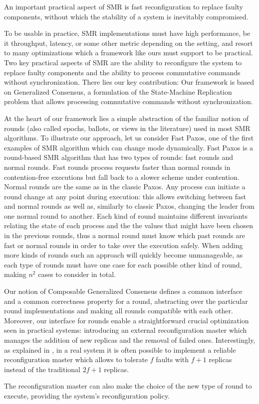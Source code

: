 An important practical aspect of SMR is fast reconfiguration to replace faulty components, without which the stability of a system is inevitably compromised.

To be usable in  practice, SMR implementations must have high performance, be it throughput, latency, or some other metric depending on the setting, and resort to many optimizations which a framework like ours must support to be practical.
Two key practical aspects of SMR are the ability to reconfigure the system to replace faulty components and the ability to process commutative commands without synchronization.
There lies our key contribution: 
Our framework is based on Generalized Consensus, a formulation of the State-Machine Replication problem that allows processing commutative commands without synchronization.

At the heart of our framework lies a simple abstraction of the familiar notion of rounds (also called epochs, ballots, or views in the literature) used in most SMR algorithms. To illustrate our approach, let us consider Fast Paxos, one of the first examples of SMR algorithm which can change mode dynamically.
Fast Paxos is a round-based SMR algorithm that has two types of rounds: fast rounds and normal rounds. Fast rounds process requests faster than normal rounds in contention-free executions but fall back to a slower scheme under contention. Normal rounds are the same as in the classic Paxos. Any process can initiate a round change at any point during execution: this allows switching between fast and normal rounds as well as, similarly to classic Paxos, changing the leader from one normal round to
another. Each kind of round maintains different invariants relating the state of each process and the the values that might have been chosen in the previous rounds, thus a normal round must know which past rounds are fast or normal rounds in order to take over the execution safely. When adding more kinds of rounds such an approach will quickly become unmanageable, as each type of rounds must have one case for each possible other kind of round, making $n^2$ cases to consider in total.

Our notion of Composable Generalized Consensus defines a common interface and a common correctness property for a round, abstracting over the particular round implementations and making all rounds compatible with each other. 
Moreover, our interface for rounds enable a straightforward crucial optimization seen in practical systems: introducing an external reconfiguration master which manages the addition of new replicas and the removal of failed ones. Interestingly, as explained in \cite{LamportMalkhiZhou09VerticalPaxosPrimarybackupReplication}, in a real system it is often possible to implement a reliable reconfiguration master which allows to tolerate $f$ faults with $f+1$ replicas instead of the traditional $2f+1$ replicas.

The reconfiguration master can also make the choice of the new type of round to execute, providing the system's reconfiguration policy. 


